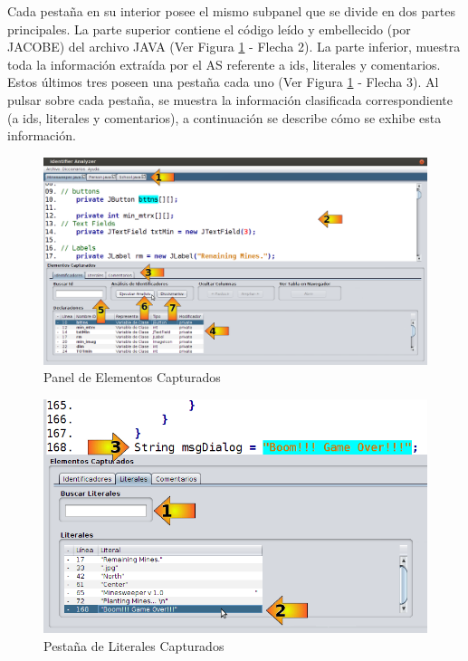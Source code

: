 Cada pestaña en su interior posee el mismo subpanel que se divide en dos partes principales. La parte superior contiene el código leído y embellecido (por JACOBE) del archivo JAVA (Ver Figura \ref{ida3} - Flecha 2).
La parte inferior, muestra toda la información extraída por el AS referente a ids, literales y comentarios. Estos últimos tres poseen una pestaña cada uno (Ver Figura \ref{ida3} - Flecha 3). Al pulsar sobre cada pestaña, se muestra la información clasificada correspondiente (a ids, literales y comentarios), a continuación se describe cómo se exhibe esta información.

\begin{figure}[t] %
\centerline{%
\includegraphics[scale= 0.42]{./cap4/ida_03.png}
}
\caption{Panel de Elementos Capturados}
\label{ida3}
\end{figure}



\begin{figure}[h!] %
\centerline{%
\includegraphics[scale= 0.5]{./cap4/ida_04.png}
}
\caption{Pestaña de Literales Capturados}
\label{ida4}
\end{figure}


